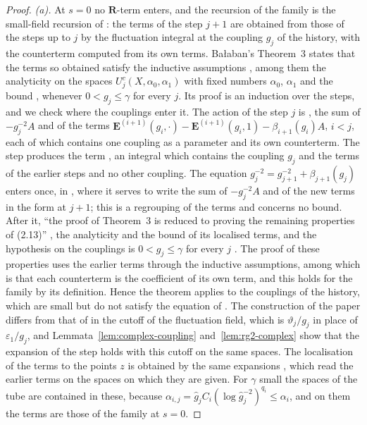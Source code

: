 \documentclass[11pt]{preprint}
\numberwithin{equation}{section}
\theoremstyle{definition}
\theoremstyle{remark}
\theoremstyle{plain}
\begin{document}
\begin{proof}
\emph{(a).} At $s = 0$ no $\mathbf R$-term enters, and the recursion of the family is the small-field recursion of \cite{BalabanRG1,BalabanRG2}: the terms of the step $j + 1$ are obtained from those of the steps up to $j$ by the fluctuation integral \cite[(2.12), (2.13), p.~268]{BalabanRG1} at the coupling $g_j$ of the history, with the counterterm computed from its own terms. Ba{\l}aban's Theorem~3 \cite[p.~264]{BalabanRG1} states that the terms so obtained satisfy the inductive assumptions \cite[(1.1)--(1.22)]{BalabanRG1}, among them the analyticity on the spaces $U^c_j(X, \alpha_0, \alpha_1)$ with fixed numbers $\alpha_0$, $\alpha_1$ and the bound \cite[(1.18), p.~263]{BalabanRG1}, whenever $0 < g_j \leq \gamma$ for every $j$. Its proof is an induction over the steps, and we check where the couplings enter it. The action of the step $j$ is \cite[(1.6), p.~261]{BalabanRG1}, the sum of $-g_j^{-2}A$ and of the terms $\mathbf E^{(i+1)}(g_i, \cdot) - \mathbf E^{(i+1)}(g_i, 1) - \beta_{i+1}(g_i)A$, $i < j$, each of which contains one coupling as a parameter and its own counterterm. The step produces the term \cite[(2.13), p.~268]{BalabanRG1}, an integral which contains the coupling $g_j$ and the terms of the earlier steps and no other coupling. The equation $g_j^{-2} = g_{j+1}^{-2} + \beta_{j+1}(g_j)$ enters once, in \cite[(2.15), p.~268]{BalabanRG1}, where it serves to write the sum of $-g_j^{-2}A$ and of the new terms in the form \cite[(1.3)]{BalabanRG1} at $j + 1$; this is a regrouping of the terms and concerns no bound. After it, ``the proof of Theorem~3 is reduced to proving the remaining properties of (2.13)'' \cite[p.~269]{BalabanRG1}, the analyticity and the bound \cite[(1.18)]{BalabanRG1} of its localised terms, and the hypothesis on the couplings is $0 < g_j \leq \gamma$ for every $j$ \cite[Theorem~3]{BalabanRG1}. The proof of these properties uses the earlier terms through the inductive assumptions, among which is that each counterterm is the coefficient \cite[(1.22), p.~264]{BalabanRG1} of its own term, and this holds for the family by its definition. Hence the theorem applies to the couplings of the history, which are small but do not satisfy the equation of \cite{BalabanRG1}. The construction of the paper differs from that of \cite{BalabanRG1} in the cutoff of the fluctuation field, which is $\vartheta_j/g_j$ in place of $\varepsilon_1/g_j$, and Lemmata~\ref{lem:complex-coupling} and~\ref{lem:rg2-complex} show that the expansion of the step holds with this cutoff on the same spaces. The localisation \cite[(2.26), (2.27), p.~259]{BalabanCRE} of the terms to the points $z$ is obtained by the same expansions \cite[pp.~272--278]{BalabanCRE}, which read the earlier terms on the spaces on which they are given. For $\gamma$ small the spaces of the tube are contained in these, because $\alpha_{i,j} = \hat g_jC_i(\log\hat g_j^{-2})^{q_i} \leq \alpha_i$, and on them the terms are those of the family at $s = 0$.


\end{proof}
\end{document}
